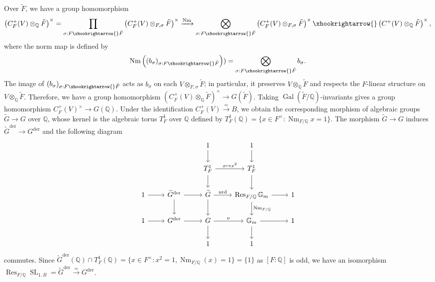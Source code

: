 \documentclass{amsart}
\numberwithin{equation}{subsection}
\numberwithin{theorem}{section}
\theoremstyle{definition}
\theoremstyle{remark}
\newcommand{\bQ}{\mathbb{Q}}
\DeclareMathOperator{\SL}{SL}
\DeclareMathOperator{\Nm}{Nm}
\DeclareMathOperator{\nrd}{nrd}
\DeclareMathOperator{\Gal}{Gal}
\DeclareMathOperator{\Res}{Res}
\DeclareMathOperator{\der}{der}
\begin{document}
Over $\tilde{F}$, we have a group homomorphism \[\left(C_F^+(V) \otimes_{\bQ}\tilde{F}\right)^\times = \prod_{\sigma:F\xhookrightarrow{}\tilde{F}}\left(C_F^+(V) \otimes_{F, \sigma} \tilde{F} \right)^\times \xrightarrow{\Nm}\bigotimes_{\sigma:F\xhookrightarrow{}\tilde{F}} \left(C_F^+(V)\otimes_{F, \sigma} \tilde{F}\right)^\times\xhookrightarrow{} \left(C^+(V)\otimes_{\bQ}\tilde{F}\right)^\times,\] where the norm map is defined by \[\Nm\left((b_{\sigma})_{\sigma: F\xhookrightarrow{}\tilde{F}} \right)) = \bigotimes_{\sigma:F\xhookrightarrow{}\tilde{F}} b_{\sigma}.\]
The image of $ (b_{\sigma})_{\sigma: F\xhookrightarrow{}\tilde{F}}$ acts as $b_\sigma$ on each $V\otimes_{F,\sigma}\tilde{F}$; in particular, it preserves $V\otimes_{\bQ}\tilde{F}$ and respects the $F$-linear structure on $V\otimes_{\bQ}\tilde{F}$. Therefore, we have a group homomorphism $(C_F^+(V)\otimes_\bQ \tilde{F})^\times  \to G(\tilde{F})$. 
Taking $\Gal(\tilde{F}/\bQ)$-invariants gives a group homomorphism $C_F^+(V)^\times \to G(\bQ)$. Under the identification $C_F^+(V)\xrightarrow{\simeq}B$, we obtain the corresponding morphism of algebraic groups $\widetilde{G}\to G$ over $\bQ$, whose kernel is the algebraic torus $T_F^1$ over $\bQ$ defined by $T_F^1(\bQ) = \{x\in F^\times : \Nm_{F/\bQ} x = 1\}$. 
The morphism $\widetilde{G}\to G$ induces $\widetilde{G}^{\der} \to G^{\der}$ and the following diagram \[
\begin{tikzcd}
& & 1 \arrow[d] & 1 \arrow[d] &\\
&   & T_F^1 \arrow[r, "x\mapsto x^2"] \arrow[d] & T_F^1 \arrow[d] & \\
1 \arrow[r] & \widetilde{G}^{\der} \arrow[r] \arrow[d] & \widetilde{G} \arrow[r, "\nrd"] \arrow[d] & \Res_{F/\bQ}\mathbb{G}_m \arrow[r] \arrow[d, "\Nm_{F/\bQ}"] & 1 \\
1 \arrow[r] & G^{\der} \arrow[r] & G \arrow[r, "\nu"] \arrow[d] & \mathbb{G}_m \arrow[r] \arrow[d] & 1 \\
&  & 1 & 1 &
\end{tikzcd}
\] commutes. Since $\widetilde{G}^{\der}(\bQ)\cap T_F^1(\bQ) = \{x\in F^\times : x^2 = 1, \Nm_{F/\bQ}(x) = 1\}=\{1\}$ as $[F:\bQ]$ is odd, we have an isomorphism $\Res_{F/\bQ} \SL_{1,B}=\widetilde{G}^{\der} \xrightarrow{\simeq}G^{\der}$.
\end{document}
